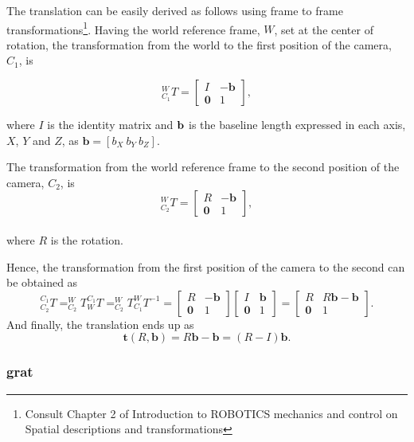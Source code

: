 The translation can be easily derived as follows using frame to frame transformations\footnote{Consult Chapter 2 of Introduction to ROBOTICS mechanics and control \cite{robotics} on Spatial descriptions and transformations}. Having the world reference frame, ${W}$, set at the center of rotation, the transformation from the world to the first position of the camera, ${C_1}$, is

\begin{equation}
^W_{C_1}T = \begin{bmatrix}
I & -\mathbf{b}\\ 
\mathbf{0} & 1
\end{bmatrix},
\end{equation} 

where $I$ is the identity matrix and $\bf b$ is the baseline length expressed in each axis, $X$, $Y$ and $Z$, as $\mathbf{b} = [b_X \ b_Y \ b_Z]$. 

The transformation from the world reference frame to the second position of the camera, ${C_2}$, is
\begin{equation}
^W_{C_2}T = \begin{bmatrix}
R & -\mathbf{b}\\ 
\mathbf{0} & 1
\end{bmatrix},
\end{equation}\\
where $R$ is the rotation.

Hence, the transformation from the first position of the camera to the second can be obtained as
\begin{equation}
^{C_1}_{C_2}T = ^{W}_{C_2}T ^{C_1}_{W}T = ^{W}_{C_2}T ^{W}_{C_1}T^{-1} = 
\begin{bmatrix}
R & -\mathbf{b}\\ 
\mathbf{0} & 1
\end{bmatrix}
\begin{bmatrix}
I & \mathbf{b}\\ 
\mathbf{0} & 1
\end{bmatrix}
=
\begin{bmatrix}
R & R\mathbf{b}-\mathbf{b}\\ 
\mathbf{0} & 1
\end{bmatrix}.
\end{equation}
And finally, the translation ends up as
\begin{equation}
\mathbf{t}(R, \mathbf{b}) = R\mathbf{b}-\mathbf{b} = (R-I)\mathbf{b}.
\end{equation}


\subsubsection{\acrlong{grat}}

